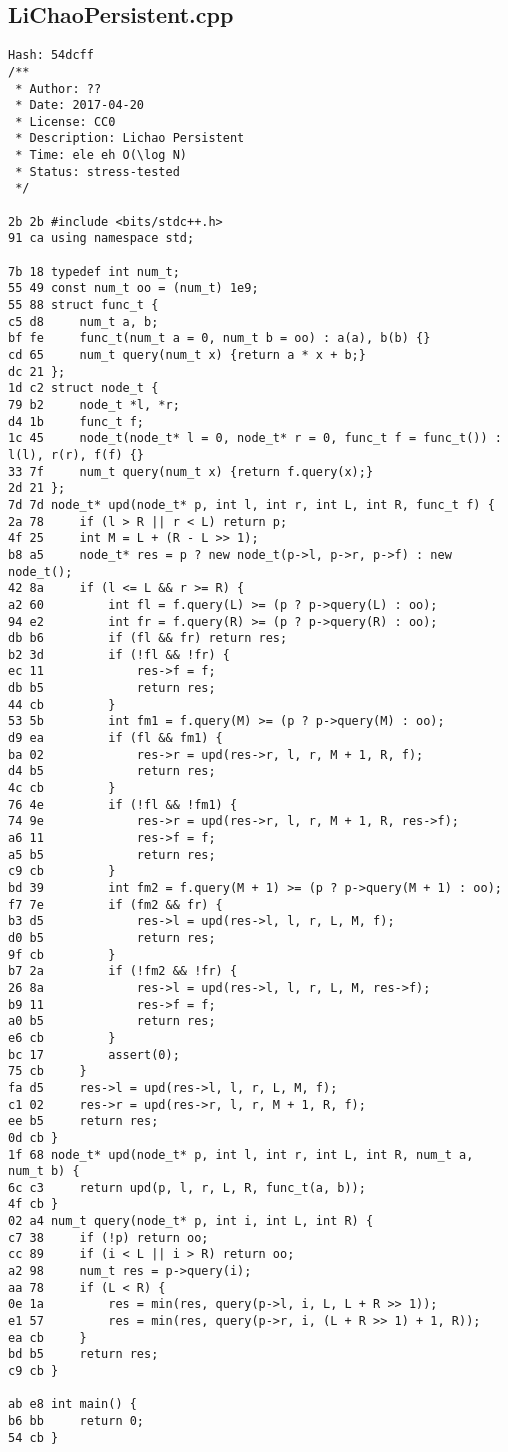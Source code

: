 \documentclass[11pt, a4paper, twoside]{article}
\begin{document}
\subsection{LiChaoPersistent.cpp}
\begin{lstlisting}
Hash: 54dcff
/**
 * Author: ??
 * Date: 2017-04-20
 * License: CC0
 * Description: Lichao Persistent
 * Time: ele eh O(\log N)
 * Status: stress-tested
 */

2b 2b #include <bits/stdc++.h>
91 ca using namespace std;

7b 18 typedef int num_t;
55 49 const num_t oo = (num_t) 1e9;
55 88 struct func_t {
c5 d8     num_t a, b;
bf fe     func_t(num_t a = 0, num_t b = oo) : a(a), b(b) {}
cd 65     num_t query(num_t x) {return a * x + b;}
dc 21 };
1d c2 struct node_t {
79 b2     node_t *l, *r;
d4 1b     func_t f;
1c 45     node_t(node_t* l = 0, node_t* r = 0, func_t f = func_t()) : l(l), r(r), f(f) {}
33 7f     num_t query(num_t x) {return f.query(x);}
2d 21 };
7d 7d node_t* upd(node_t* p, int l, int r, int L, int R, func_t f) {
2a 78     if (l > R || r < L) return p;
4f 25     int M = L + (R - L >> 1);
b8 a5     node_t* res = p ? new node_t(p->l, p->r, p->f) : new node_t();
42 8a     if (l <= L && r >= R) {
a2 60         int fl = f.query(L) >= (p ? p->query(L) : oo);
94 e2         int fr = f.query(R) >= (p ? p->query(R) : oo);
db b6         if (fl && fr) return res;
b2 3d         if (!fl && !fr) {
ec 11             res->f = f;
db b5             return res;
44 cb         }
53 5b         int fm1 = f.query(M) >= (p ? p->query(M) : oo);
d9 ea         if (fl && fm1) {
ba 02             res->r = upd(res->r, l, r, M + 1, R, f);
d4 b5             return res;
4c cb         }
76 4e         if (!fl && !fm1) {
74 9e             res->r = upd(res->r, l, r, M + 1, R, res->f);
a6 11             res->f = f;
a5 b5             return res;
c9 cb         }
bd 39         int fm2 = f.query(M + 1) >= (p ? p->query(M + 1) : oo);
f7 7e         if (fm2 && fr) {
b3 d5             res->l = upd(res->l, l, r, L, M, f);
d0 b5             return res;
9f cb         }
b7 2a         if (!fm2 && !fr) {
26 8a             res->l = upd(res->l, l, r, L, M, res->f);
b9 11             res->f = f;
a0 b5             return res;
e6 cb         }
bc 17         assert(0);
75 cb     }
fa d5     res->l = upd(res->l, l, r, L, M, f);
c1 02     res->r = upd(res->r, l, r, M + 1, R, f);
ee b5     return res;
0d cb }
1f 68 node_t* upd(node_t* p, int l, int r, int L, int R, num_t a, num_t b) {
6c c3     return upd(p, l, r, L, R, func_t(a, b));
4f cb }
02 a4 num_t query(node_t* p, int i, int L, int R) {
c7 38     if (!p) return oo;
cc 89     if (i < L || i > R) return oo;
a2 98     num_t res = p->query(i);
aa 78     if (L < R) {
0e 1a         res = min(res, query(p->l, i, L, L + R >> 1));
e1 57         res = min(res, query(p->r, i, (L + R >> 1) + 1, R));
ea cb     }
bd b5     return res;
c9 cb }

ab e8 int main() {
b6 bb     return 0;
54 cb }
\end{lstlisting}
\end{document}
